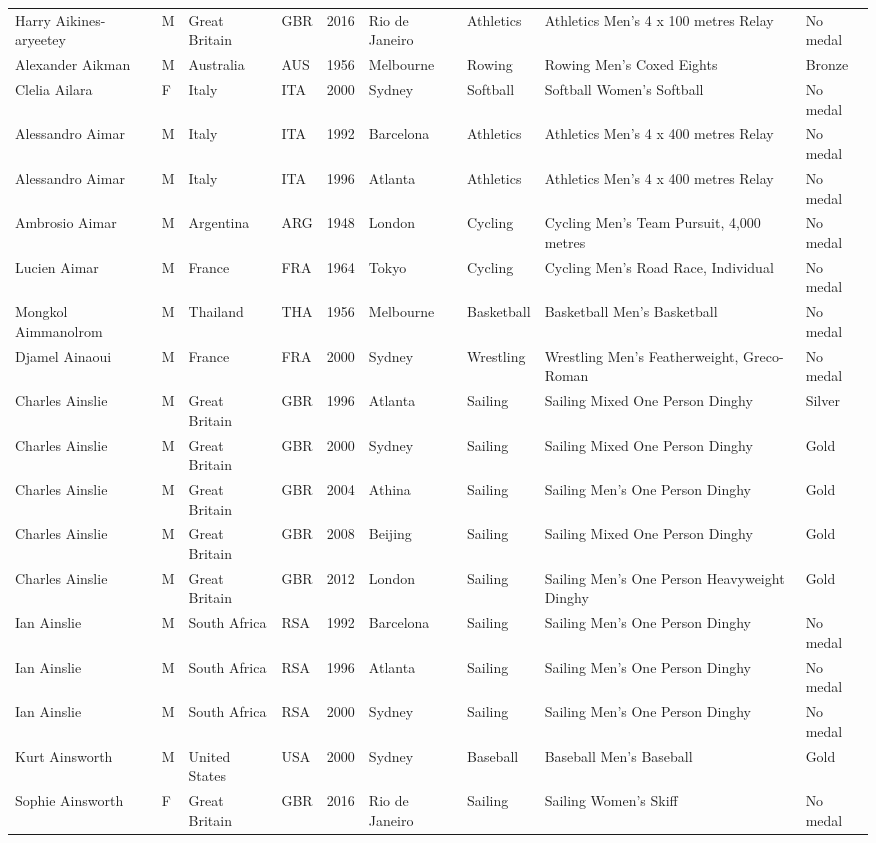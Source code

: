 \documentclass{article}%
\begin{document}
\begin{longtable}{p{1.5cm} p{0.5cm} p{2cm} p{1cm} p{1cm} p{1.5cm} p{1.5cm} p{5cm} p{1.5cm}}
Harry Aikines{-}aryeetey&M&Great Britain&GBR&2016&Rio de Janeiro&Athletics&Athletics Men's 4 x 100 metres Relay&No medal\\%
Alexander Aikman&M&Australia&AUS&1956&Melbourne&Rowing&Rowing Men's Coxed Eights&Bronze\\%
Clelia Ailara&F&Italy&ITA&2000&Sydney&Softball&Softball Women's Softball&No medal\\%
Alessandro Aimar&M&Italy&ITA&1992&Barcelona&Athletics&Athletics Men's 4 x 400 metres Relay&No medal\\%
Alessandro Aimar&M&Italy&ITA&1996&Atlanta&Athletics&Athletics Men's 4 x 400 metres Relay&No medal\\%
Ambrosio Aimar&M&Argentina&ARG&1948&London&Cycling&Cycling Men's Team Pursuit, 4,000 metres&No medal\\%
Lucien Aimar&M&France&FRA&1964&Tokyo&Cycling&Cycling Men's Road Race, Individual&No medal\\%
Mongkol Aimmanolrom&M&Thailand&THA&1956&Melbourne&Basketball&Basketball Men's Basketball&No medal\\%
Djamel Ainaoui&M&France&FRA&2000&Sydney&Wrestling&Wrestling Men's Featherweight, Greco{-}Roman&No medal\\%
Charles Ainslie&M&Great Britain&GBR&1996&Atlanta&Sailing&Sailing Mixed One Person Dinghy&Silver\\%
Charles Ainslie&M&Great Britain&GBR&2000&Sydney&Sailing&Sailing Mixed One Person Dinghy&Gold\\%
Charles Ainslie&M&Great Britain&GBR&2004&Athina&Sailing&Sailing Men's One Person Dinghy&Gold\\%
Charles Ainslie&M&Great Britain&GBR&2008&Beijing&Sailing&Sailing Mixed One Person Dinghy&Gold\\%
Charles Ainslie&M&Great Britain&GBR&2012&London&Sailing&Sailing Men's One Person Heavyweight Dinghy&Gold\\%
Ian Ainslie&M&South Africa&RSA&1992&Barcelona&Sailing&Sailing Men's One Person Dinghy&No medal\\%
Ian Ainslie&M&South Africa&RSA&1996&Atlanta&Sailing&Sailing Men's One Person Dinghy&No medal\\%
Ian Ainslie&M&South Africa&RSA&2000&Sydney&Sailing&Sailing Men's One Person Dinghy&No medal\\%
Kurt Ainsworth&M&United States&USA&2000&Sydney&Baseball&Baseball Men's Baseball&Gold\\%
Sophie Ainsworth&F&Great Britain&GBR&2016&Rio de Janeiro&Sailing&Sailing Women's Skiff&No medal\\%

\end{longtable}
\end{document}

